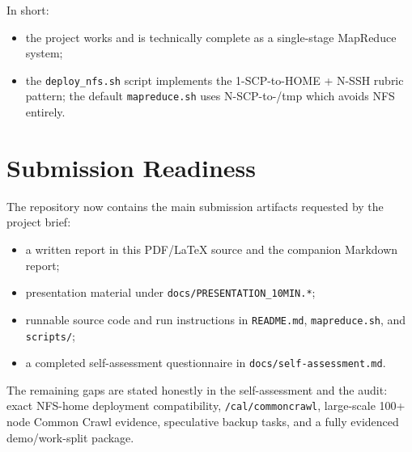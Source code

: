 \documentclass[11pt,a4paper]{article}
\begin{document}
In short:
\begin{itemize}[leftmargin=1.5em]
  \item the project works and is technically complete as a single-stage
  MapReduce system;
  \item the \texttt{deploy\_nfs.sh} script implements the 1-SCP-to-HOME + N-SSH
  rubric pattern; the default \texttt{mapreduce.sh} uses N-SCP-to-/tmp which
  avoids NFS entirely.
\end{itemize}


\section{Submission Readiness}

The repository now contains the main submission artifacts requested by the
project brief:

\begin{itemize}[leftmargin=1.5em]
  \item a written report in this PDF/\LaTeX{} source and the companion
  Markdown report;
  \item presentation material under \texttt{docs/PRESENTATION\_10MIN.*};
  \item runnable source code and run instructions in \texttt{README.md},
  \texttt{mapreduce.sh}, and \texttt{scripts/};
  \item a completed self-assessment questionnaire in
  \texttt{docs/self-assessment.md}.
\end{itemize}

The remaining gaps are stated honestly in the self-assessment and the audit:
exact NFS-home deployment compatibility, \texttt{/cal/commoncrawl}, large-scale
100+ node Common Crawl evidence, speculative backup tasks, and a fully
evidenced demo/work-split package.
\end{document}
